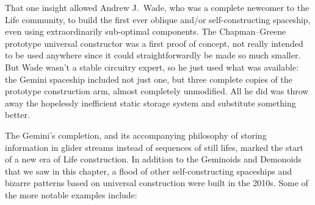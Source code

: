 That one insight allowed Andrew J.~Wade, who was a complete newcomer to the Life community, to build the first ever oblique and/or self-constructing spaceship, even using extraordinarily sub-optimal components. The Chapman--Greene prototype universal constructor was a first proof of concept, not really intended to be used anywhere since it could straightforwardly be made so much smaller. But Wade wasn't a stable circuitry expert, so he just used what was available: the Gemini spaceship included not just one, but three complete copies of the prototype construction arm, almost completely unmodified. All he did was throw away the hopelessly inefficient static storage system and substitute something better.

The Gemini's completion, and its accompanying philosophy of storing information in glider streams instead of sequences of still lifes, marked the start of a new era of Life construction. In addition to the Geminoids and Demonoids that we saw in this chapter, a flood of other self-constructing spaceships and bizarre patterns based on universal construction were built in the 2010s. Some of the more notable examples include:\smallskip

